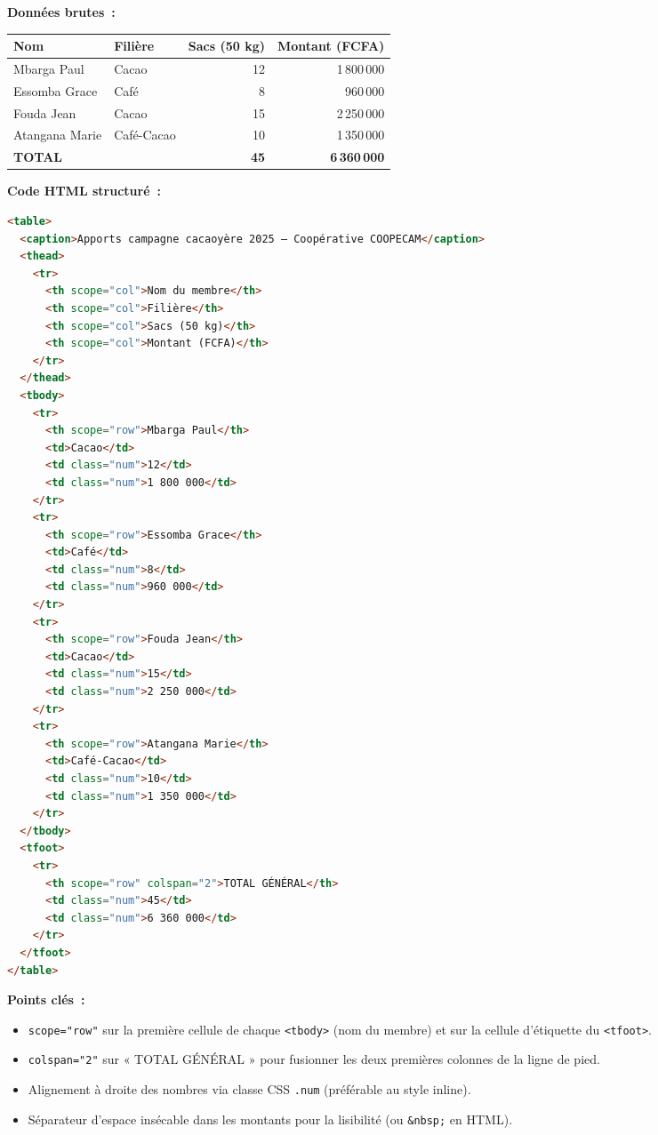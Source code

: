 \documentclass[11pt]{article}
\begin{document}
\begin{exemplebox}
\textbf{Données brutes~:}
\begin{center}
\begin{tabular}{|l|l|r|r|}
\hline
\textbf{Nom} & \textbf{Filière} & \textbf{Sacs (50 kg)} & \textbf{Montant (FCFA)} \\
\hline
Mbarga Paul & Cacao & 12 & 1\,800\,000 \\
Essomba Grace & Café & 8 & 960\,000 \\
Fouda Jean & Cacao & 15 & 2\,250\,000 \\
Atangana Marie & Café-Cacao & 10 & 1\,350\,000 \\
\hline
\textbf{TOTAL} & & \textbf{45} & \textbf{6\,360\,000} \\
\hline
\end{tabular}
\end{center}

\textbf{Code HTML structuré~:}
\begin{lstlisting}[language=HTML]
<table>
  <caption>Apports campagne cacaoyère 2025 — Coopérative COOPECAM</caption>
  <thead>
    <tr>
      <th scope="col">Nom du membre</th>
      <th scope="col">Filière</th>
      <th scope="col">Sacs (50 kg)</th>
      <th scope="col">Montant (FCFA)</th>
    </tr>
  </thead>
  <tbody>
    <tr>
      <th scope="row">Mbarga Paul</th>
      <td>Cacao</td>
      <td class="num">12</td>
      <td class="num">1 800 000</td>
    </tr>
    <tr>
      <th scope="row">Essomba Grace</th>
      <td>Café</td>
      <td class="num">8</td>
      <td class="num">960 000</td>
    </tr>
    <tr>
      <th scope="row">Fouda Jean</th>
      <td>Cacao</td>
      <td class="num">15</td>
      <td class="num">2 250 000</td>
    </tr>
    <tr>
      <th scope="row">Atangana Marie</th>
      <td>Café-Cacao</td>
      <td class="num">10</td>
      <td class="num">1 350 000</td>
    </tr>
  </tbody>
  <tfoot>
    <tr>
      <th scope="row" colspan="2">TOTAL GÉNÉRAL</th>
      <td class="num">45</td>
      <td class="num">6 360 000</td>
    </tr>
  </tfoot>
</table>
\end{lstlisting}
\textbf{Points clés~:}
\begin{itemize}
    \item \texttt{scope="row"} sur la première cellule de chaque \texttt{<tbody>} (nom du membre) et sur la cellule d'étiquette du \texttt{<tfoot>}.
    \item \texttt{colspan="2"} sur « TOTAL GÉNÉRAL » pour fusionner les deux premières colonnes de la ligne de pied.
    \item Alignement à droite des nombres via classe CSS \texttt{.num} (préférable au style inline).
    \item Séparateur d'espace insécable dans les montants pour la lisibilité (ou \texttt{\&nbsp;} en HTML).
\end{itemize}
\end{exemplebox}
\end{document}
